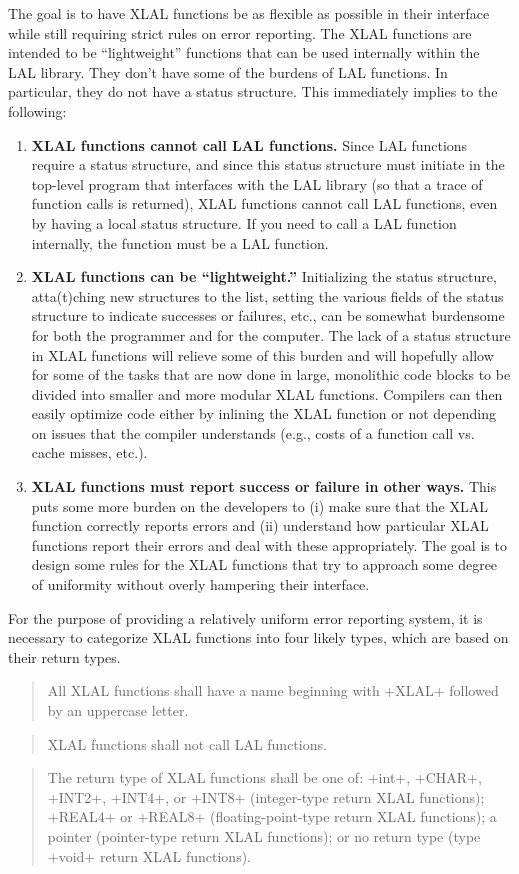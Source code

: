 \documentclass[10pt]{ligodcc}
\makeatletter
\def\verb{\relax\ifmmode\hbox\else\leavevmode\null\fi
  \bgroup
    \color{blue}\small
    \verb@eol@error \let\do\@makeother \dospecials
    \verbatim@font\@noligs
    \@ifstar\@sverb\@verb}
\newlength{\fminilength}
\newenvironment{fminipage}[1][\linewidth]
  {\setlength{\fminilength}{#1-2\fboxsep-2\fboxrule}%
   \begin{lrbox}{\fminibox}\begin{minipage}{\fminilength}}
  {\end{minipage}\end{lrbox}\noindent\fbox{\usebox{\fminibox}}}
\newenvironment{lalrule}{\begin{quote}\color{red}\begin{fminipage}}
  {\end{fminipage}\end{quote}}
\makeatother
\begin{document}
The goal is to have XLAL functions be as flexible as possible in their
interface while still requiring strict rules on error reporting.  The
XLAL functions are intended to be ``lightweight'' functions that can
be used internally within the LAL library.  They don't have some of the
burdens of LAL functions.  In particular, they do not have a status structure.
This immediately implies to the following:
\begin{enumerate}
\item \textbf{XLAL functions cannot call LAL functions.}  Since LAL functions
require a status structure, and since this status structure must initiate in
the top-level program that interfaces with the LAL library (so that a trace of
function calls is returned), XLAL functions cannot call LAL functions, even
by having a local status structure.  If you need to call a LAL function
internally, the function must be a LAL function.
\item \textbf{XLAL functions can be ``lightweight.''}  Initializing the status
structure, atta(t)ching new structures to the list, setting the various fields
of the status structure to indicate successes or failures, etc., can be
somewhat burdensome for both the programmer and for the computer.  The lack
of a status structure in XLAL functions will relieve some of this burden and
will hopefully allow for some of the tasks that are now done in large,
monolithic code blocks to be divided into smaller and more modular XLAL
functions.  Compilers can then easily optimize code either by inlining the
XLAL function or not depending on issues that the compiler understands
(e.g., costs of a function call vs. cache misses, etc.).
\item \textbf{XLAL functions must report success or failure in other ways.}
This puts some more burden on the developers to (i) make sure that the XLAL
function correctly reports errors and (ii) understand how particular XLAL
functions report their errors and deal with these appropriately.  The goal
is to design some rules for the XLAL functions that try to approach some
degree of uniformity without overly hampering their interface.
\end{enumerate}
For the purpose of providing a relatively uniform error reporting system, it
is necessary to categorize XLAL functions into four likely types, which are 
based on their return types.
\begin{lalrule}
All XLAL functions shall have a name beginning with \verb+XLAL+ followed by
an uppercase letter.
\end{lalrule}
\begin{lalrule}
XLAL functions shall not call LAL functions.
\end{lalrule}
\begin{lalrule}
The return type of XLAL functions shall be one of:
\verb+int+, \verb+CHAR+, \verb+INT2+, \verb+INT4+, or \verb+INT8+ (integer-type
return XLAL functions); \verb+REAL4+ or \verb+REAL8+ (floating-point-type
return XLAL functions); a pointer (pointer-type return XLAL functions);
or no return type (type \verb+void+ return XLAL functions).
\end{lalrule}
\end{document}
